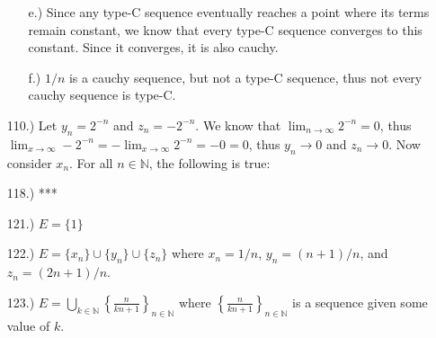\documentclass[12pt]{article}
\newcommand{\vertb}[1]{\left\vert#1\right\vert}
\newcommand{\e}{\varepsilon}
\newcommand{\lm}[1]{\displaystyle\lim_{#1}}
\begin{document}
\begin{itemize}
\begin{itemize}
        \item [e.)] Since any type-C sequence eventually reaches a point where its terms remain constant, we know that every type-C sequence converges to this constant. Since it converges, it is also cauchy.

        \item [f.)] $1/n$ is a cauchy sequence, but not a type-C sequence, thus not every cauchy sequence is type-C.
    \end{itemize}

    \item [110.)] Let $y_n=2^{-n}$ and $z_n=-2^{-n}$. We know that $\lm{n\to\infty}2^{-n}=0$, thus $\lm{x\to\infty}-2^{-n}=-\lm{x\to\infty}2^{-n}=-0=0$, thus $y_n\to0$ and $z_n\to0$. Now consider $x_n$. For all $n\in\mathbb{N}$, the following is true:



    \item [118.)] ***



    \item [121.)] $E=\{1\}$

    \item [122.)] $E=\{x_n\}\cup\{y_n\}\cup\{z_n\}$ where $x_n=1/n$, $y_n=(n+1)/n$, and $z_n=(2n+1)/n$.

    \item [123.)] $E=\displaystyle\bigcup_{k\in\mathbb{N}}\left\{\frac{n}{kn+1}\right\}_{n\in\mathbb{N}}$ where $\displaystyle\left\{\frac{n}{kn+1}\right\}_{n\in\mathbb{N}}$ is a sequence given some value of $k$.





\end{itemize}
\end{document}
